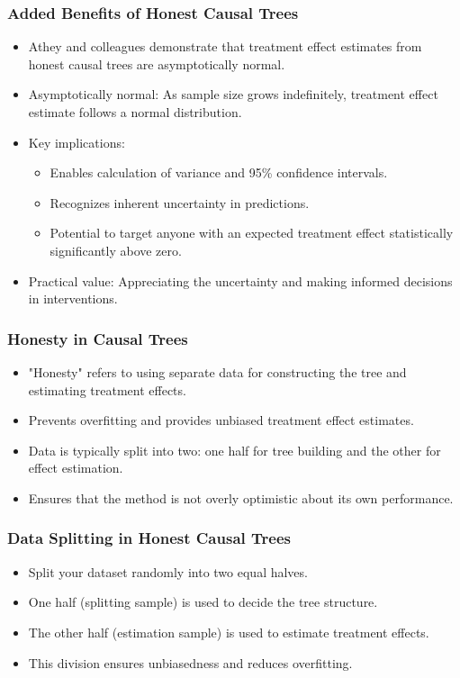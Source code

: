 \documentclass{beamer}
\begin{document}
\begin{frame}
\frametitle{Added Benefits of Honest Causal Trees}
\begin{itemize}
    \item Athey and colleagues demonstrate that treatment effect estimates from honest causal trees are asymptotically normal.
    \item Asymptotically normal: As sample size grows indefinitely, treatment effect estimate follows a normal distribution.
    \item Key implications:
    \begin{itemize}
        \item Enables calculation of variance and 95\% confidence intervals.
        \item Recognizes inherent uncertainty in predictions.
        \item Potential to target anyone with an expected treatment effect statistically significantly above zero.
    \end{itemize}
    \item Practical value: Appreciating the uncertainty and making informed decisions in interventions.
\end{itemize}
\end{frame}


\begin{frame}
\frametitle{Honesty in Causal Trees}
\begin{itemize}
    \item "Honesty" refers to using separate data for constructing the tree and estimating treatment effects.
    \item Prevents overfitting and provides unbiased treatment effect estimates.
    \item Data is typically split into two: one half for tree building and the other for effect estimation.
    \item Ensures that the method is not overly optimistic about its own performance.
\end{itemize}
\end{frame}

\begin{frame}
\frametitle{Data Splitting in Honest Causal Trees}
\begin{itemize}
\item Split your dataset randomly into two equal halves.
\item One half (splitting sample) is used to decide the tree structure.
\item The other half (estimation sample) is used to estimate treatment effects.
\item This division ensures unbiasedness and reduces overfitting.
\end{itemize}
\end{frame}
\end{document}
